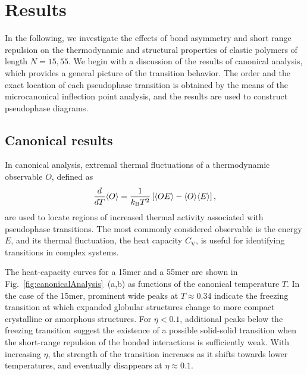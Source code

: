 \documentclass[12pt]{report}
\begin{document}
\section{Results}
%
In the following, we investigate the effects of bond asymmetry and short range repulsion on the thermodynamic and structural properties of elastic polymers of length $N=15,55$.  We begin with a discussion of the results of canonical analysis, which provides a general picture of the transition behavior. The order and the exact location of each pseudophase transition is obtained by the means of the microcanonical inflection point analysis, and the results are used to construct pseudophase diagrams. 


\subsection{Canonical results}
In canonical analysis, extremal thermal fluctuations of a thermodynamic observable $O$, defined as
%
\begin{equation}
    \frac{d}{d T}\langle O\rangle = \frac{1}{k_{\rm B}T^2} \left[ \langle O E 
    \rangle-\langle O\rangle\langle E\rangle \right],
    \label{eq:fluctuation}
\end{equation}
%
are used to locate regions of increased thermal activity associated with pseudophase transitions. The most commonly considered observable is the energy $E$, and its thermal fluctuation, the heat capacity $C_{\mathrm{V}}$, is useful for identifying transitions in complex systems. 

The heat-capacity curves for a 15mer and a 55mer are shown in Fig.~\ref{fig:canonicalAnalysis}~(a,b) as functions of the canonical temperature $T$. In the case of the 15mer, prominent wide peaks at $T \approx 0.34$ indicate the freezing transition at which expanded globular structures change to more compact crystalline or amorphous structures. For $\eta < 0.1$, additional peaks below the freezing transition suggest the existence of a possible solid-solid transition when the short-range repulsion of the bonded interactions is sufficiently weak. With increasing $\eta$, the strength of the transition increases as it shifts towards lower temperatures, and eventually disappears at $\eta \approx 0.1$. 
\end{document}
